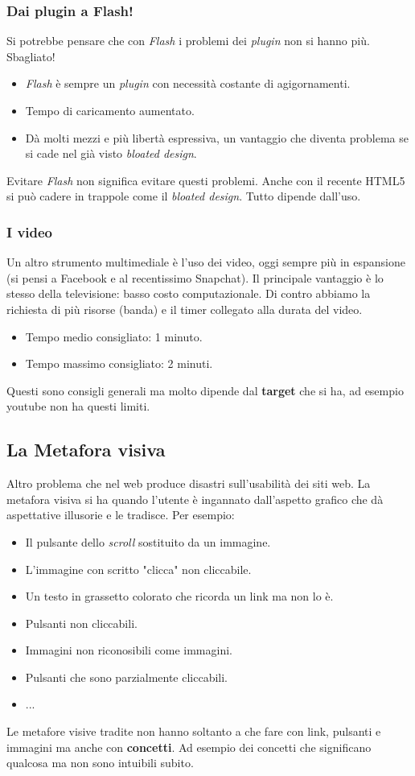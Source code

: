 			\subsubsection{Dai plugin a Flash!}
				Si potrebbe pensare che con \emph{Flash} i problemi dei \emph{plugin} non si hanno più. Sbagliato!
				\begin{itemize}
					\item \emph{Flash} è sempre un \emph{plugin} con necessità costante di agigornamenti.
					\item Tempo di caricamento aumentato.
					\item Dà molti mezzi e più libertà espressiva, un vantaggio che diventa problema se si cade nel già visto \emph{bloated design}.
				\end{itemize}
				Evitare \emph{Flash} non significa evitare questi problemi. Anche con il recente HTML5 si può cadere in trappole come il \emph{bloated design}. Tutto dipende dall'uso.
			
			\subsubsection{I video}
				Un altro strumento multimediale è l'uso dei video, oggi sempre più in espansione (si pensi a Facebook e al recentissimo Snapchat). Il principale vantaggio è lo stesso della televisione: basso costo computazionale. Di contro abbiamo la richiesta di più risorse (banda) e il timer collegato alla durata del video. 
				\begin{itemize}
					\item Tempo medio consigliato: 1 minuto.
					\item Tempo massimo consigliato: 2 minuti.
				\end{itemize}
				Questi sono consigli generali ma molto dipende dal \textbf{target} che si ha, ad esempio youtube non ha questi limiti.
		
		\subsection{La Metafora visiva}
			Altro problema che nel web produce disastri sull'usabilità dei siti web. La metafora visiva si ha quando l'utente è ingannato dall'aspetto grafico che dà aspettative illusorie e le tradisce. Per esempio:
			\begin{itemize}
				\item Il pulsante dello \emph{scroll} sostituito da un immagine.
				\item L'immagine con scritto "clicca" non cliccabile.
				\item Un testo in grassetto colorato che ricorda un link ma non lo è.
				\item Pulsanti non cliccabili.
				\item Immagini non riconosibili come immagini.
				\item Pulsanti che sono parzialmente cliccabili.
				\item ...
			\end{itemize}
			Le metafore visive tradite non hanno soltanto a che fare con link, pulsanti e immagini ma anche con \textbf{concetti}. Ad esempio dei concetti che significano qualcosa ma non sono intuibili subito.
		
